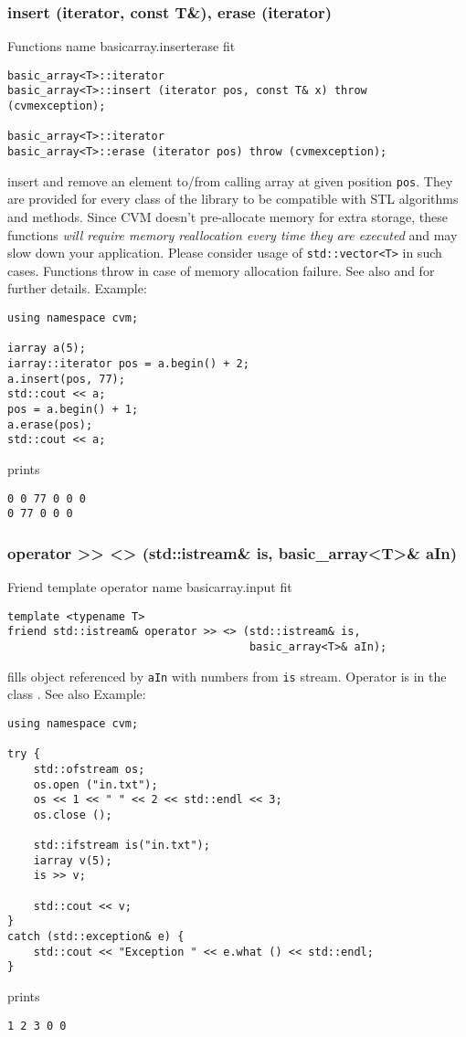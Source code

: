 \subsubsection{insert (iterator, const T\&), erase (iterator)}
Functions%
\pdfdest name {basicarray.inserterase} fit
\begin{verbatim}
basic_array<T>::iterator 
basic_array<T>::insert (iterator pos, const T& x) throw (cvmexception);

basic_array<T>::iterator 
basic_array<T>::erase (iterator pos) throw (cvmexception);
\end{verbatim}
insert and remove an element to/from calling array at given position \verb"pos".
They are provided for every class of the library to be compatible 
with STL algorithms and methods. Since CVM doesn't 
pre-allocate  memory for extra storage, these functions
\emph{will require memory reallocation every time they are executed}
and may slow down your application. Please consider usage of
\verb"std::vector<T>" in such cases.
Functions throw  
in case of memory allocation failure.
See also 
and 
for further details.
Example:
\begin{Verbatim}
using namespace cvm;

iarray a(5);
iarray::iterator pos = a.begin() + 2;
a.insert(pos, 77);
std::cout << a;
pos = a.begin() + 1;
a.erase(pos);
std::cout << a;
\end{Verbatim}
prints
\begin{Verbatim}
0 0 77 0 0 0
0 77 0 0 0
\end{Verbatim}
\newpage




\subsubsection{operator >{}> <> (std::istream\& is, basic\_array<T>\& aIn)}
Friend template operator%
\pdfdest name {basicarray.input} fit
\begin{verbatim}
template <typename T>
friend std::istream& operator >> <> (std::istream& is, 
                                     basic_array<T>& aIn);
\end{verbatim}
fills  object referenced by \verb"aIn" with numbers from
\verb"is" stream.
Operator is  in the class
.
See also  
Example:
\begin{Verbatim}
using namespace cvm;

try {
    std::ofstream os;
    os.open ("in.txt");
    os << 1 << " " << 2 << std::endl << 3;
    os.close ();

    std::ifstream is("in.txt");
    iarray v(5);
    is >> v;

    std::cout << v;
}
catch (std::exception& e) {
    std::cout << "Exception " << e.what () << std::endl;
}
\end{Verbatim}
prints
\begin{Verbatim}
1 2 3 0 0
\end{Verbatim}
\newpage



